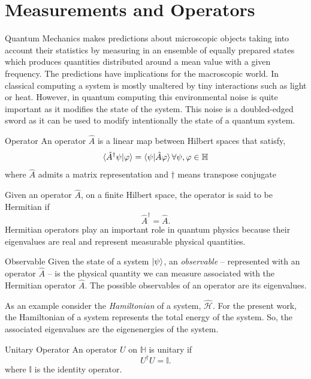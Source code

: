 \section{Measurements and Operators}
Quantum Mechanics makes predictions about microscopic objects taking into account their statistics by measuring in an ensemble of equally prepared states which produces quantities distributed around a mean value with a given frequency. The predictions have implications for the macroscopic world. In classical computing a system is mostly unaltered by tiny interactions such as light or heat. However, in quantum computing this environmental noise is quite important as it modifies the state of the system. This noise is a doubled-edged sword as it can be used to modify intentionally the state of a quantum system.
\begin{definition}{Operator}{}
    An operator $\hat{A}$ is a linear map between Hilbert spaces that satisfy,
    \begin{equation}
        \braket{\hat{A}^{\dagger}\psi|\varphi} = \braket{\psi|\hat{A}\varphi} \forall \psi,\varphi \in \mathbb{H}
    \end{equation}
    where $\hat{A}$ admits a matrix representation and $\dagger$ means transpose conjugate
\end{definition}
\begin{corollary}{}{}
    Given an operator $\hat{A}$, on a finite Hilbert space, the operator is said to be Hermitian if
    \begin{equation}
        \hat{A}^{\dagger} = \hat{A}.
    \end{equation}
    Hermitian operators play an important role in quantum physics because their eigenvalues are real and represent measurable physical quantities.
\end{corollary}
\begin{definition}{Observable}{}
    Given the state of a system $\ket{\psi}$, an \textit{observable} -- represented with an operator $\hat{A}$ -- is the physical quantity we can measure associated with the Hermitian operator $\hat{A}$. The possible observables of an operator are its eigenvalues.
\end{definition}
As an example consider the \textit{Hamiltonian} of a system, $\hat{\mathcal{H}}$. For the present work, the Hamiltonian of a system represents the total energy of the system. So, the associated eigenvalues are the eigenenergies of the system.  
\begin{definition}{Unitary Operator}{}
    An operator $U$ on $\mathbb{H}$ is unitary if
    \begin{equation}
        U^{\dagger}U =\mathbb{I}.
    \end{equation}
where $\mathbb{I}$ is the identity operator.
\end{definition}
